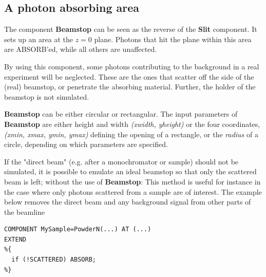 \subsection*{A photon absorbing area}
\label{beamstop}

The component \textbf{Beamstop} can be seen as the reverse of
the \textbf{Slit} component.
It sets up an area at the $z=0$ plane. Photons that hit the plane 
within this area are ABSORB'ed, while all others are unaffected.

By using this component, some photons contributing to the background
in a real experiment will be neglected.
These are the ones that scatter off the side
of the (real) beamstop, or penetrate the absorbing material.
Further, the holder of the beamstop is not simulated.

\textbf{Beamstop} can be either circular or rectangular.
The input parameters of \textbf{Beamstop} are either height and width \textit{(xwidth, yheight)} or the four coordinates,\textit{(xmin, xmax, ymin, ymax)}
defining the opening of a rectangle, or the \textit{radius} of
a circle, depending on which parameters are specified.

If the "direct beam" (e.g. after a monochromator or sample) should not be
simulated, it is possible to emulate an ideal beamstop 
so that only the scattered beam is left;
without the use of \textbf{Beamstop}:
This method is useful for instance in the case where only photons 
scattered from a sample are of interest. 
The example below removes the direct beam and 
any background signal from other parts of the beamline
\begin{verbatim}
COMPONENT MySample=PowderN(...) AT (...)
EXTEND
%{
  if (!SCATTERED) ABSORB;
%}
\end{verbatim}
